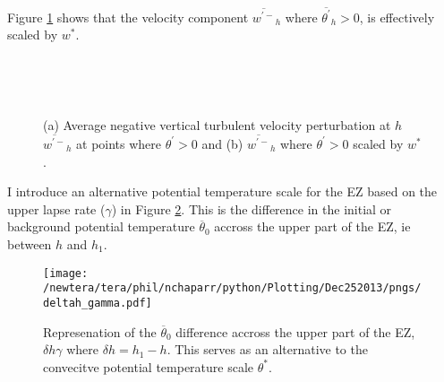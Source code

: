 \clearpage

Figure \ref{fig:downwarm_wvel} shows that the velocity component $\overline{w^{'-}}_{h}$  where $ \overline{\theta^{'}}_{h}>0$, is effectively scaled by $w^{*}$.\\   

\begin{figure}[htbp]
\begin{minipage}[b]{0.5\linewidth}
        \\
        \end{minipage}             
\quad
\begin{minipage}[b]{0.5\linewidth}
        \\       
       \end{minipage}
        \caption[Downward turbulent velocity perturbation at $h$]{(a) Average negative vertical turbulent velocity perturbation at $h$ $\overline{w^{\prime-}}_{h}$ at points where $\theta^{\prime}>0$ and (b) $\overline{w^{\prime-}}_{h}$ where $\theta^{\prime}>0$ scaled by $w^{*}$.}
        \label{fig:downwarm_wvel}
\end{figure}

I introduce an alternative potential temperature scale for the \acs{EZ} based on the upper lapse rate ($\gamma$) in Figure \ref{fig:deltahgamma}. This is the difference in the initial or background potential temperature $\overline{\theta}_{0}$ accross the upper part of the \acs{EZ}, ie between $h$ and $h_{1}$.      

\begin{figure}[htbp]
    \centering
    \texttt{[image: /newtera/tera/phil/nchaparr/python/Plotting/Dec252013/pngs/deltah\_gamma.pdf]}
    \caption[Potential Temperature Scale for the \acs{EZ} based on $\gamma$]{Represenation of the $\overline{\theta}_{0}$ difference accross the upper part of the \acs{EZ}, $\delta h \gamma$ where $\delta h = h_{1} - h$. This serves as an alternative to the convecitve potential temperature scale $\theta^{*}$.}
    \label{fig:deltahgamma}   %
\end{figure}
 

